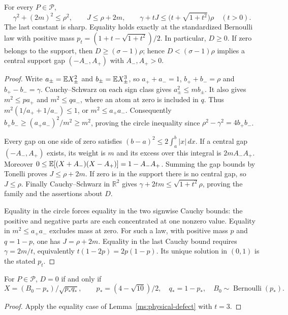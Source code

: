 \begin{lemma}
\label{ms:physical-defect}
\label{ms:fourier:afcore:lem:physical-defect}
For every $P\in\mathcal P$,
\begin{equation}
 \gamma^2+(2m)^2\le\rho^2,\qquad J\le\rho+2m,
 \qquad \gamma+tJ\le\bigl(t+\sqrt{1+t^2}\bigr)\rho\quad(t>0).
 \label{ms:gap-family}
\end{equation}
The last constant is sharp. Equality holds exactly at the standardized
Bernoulli law with positive mass $p_t=(1+t-\sqrt{1+t^2})/2$.
In particular, $D\ge0$. If zero belongs to the support, then
$D\ge(\sigma-1)\rho$; hence $D<(\sigma-1)\rho$ implies a central
support gap $(-A_-,A_+)$ with $A_-,A_+>0$.
\end{lemma}
\begin{proof}
Write $a_\pm=\mathbb E X_\pm^2$ and $b_\pm=\mathbb E X_\pm^3$, so
$a_++a_-=1$, $b_++b_-=\rho$ and $b_+-b_-=\gamma$.
Cauchy--Schwarz on each sign class gives
$a_\pm^2\le mb_\pm$. It also gives
$m^2\le pa_+$ and $m^2\le qa_-$, where an atom at zero is included
in $q$. Thus
$m^2(1/a_++1/a_-)\le1$, or $m^2\le a_+a_-$.
Consequently $b_+b_-\ge(a_+a_-)^2/m^2\ge m^2$, proving the
circle inequality since $\rho^2-\gamma^2=4b_+b_-$.

Every gap on one side of zero satisfies
$(b-a)^2\le2\int_a^b|x|\,dx$.
If a central gap $(-A_-,A_+)$ exists, its weight is $m$ and its excess
over this integral is $2mA_-A_+$. Moreover
$0\le\mathbb E[(X+A_-)(X-A_+)]=1-A_-A_+$.
Summing the gap bounds by Tonelli proves $J\le\rho+2m$.
If zero is in the support there is no central gap, so $J\le\rho$.
Finally Cauchy--Schwarz in $\mathbb R^2$ gives
$\gamma+2tm\le\sqrt{1+t^2}\rho$, proving the family and the
assertions about $D$.

Equality in the circle forces equality in the two signwise Cauchy
bounds: the positive and negative parts are each concentrated at one
nonzero value. Equality in $m^2\le a_+a_-$ excludes mass at zero.
For such a law, with positive mass $p$ and $q=1-p$, one has
$J=\rho+2m$. Equality in the last Cauchy bound requires
$\gamma=2m/t$, equivalently $t(1-2p)=2p(1-p)$.
Its unique solution in $(0,1)$ is the stated $p_t$.
\end{proof}

\begin{corollary}\label{ms:zero-defect}
For $P\in\mathcal P$, $D=0$ if and only if
\[
 X=(B_0-p_*)/\sqrt{p_*q_*},\qquad
 p_*=(4-\sqrt{10})/2,\quad q_*=1-p_*,
 \quad B_0\sim\operatorname{Bernoulli}(p_*).
\]
\end{corollary}
\begin{proof}
Apply the equality case of Lemma~\ref{ms:physical-defect} with $t=3$.
\end{proof}

